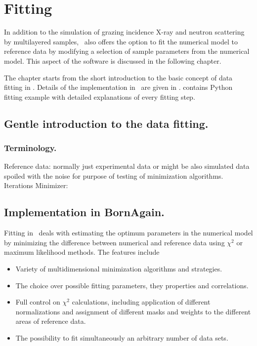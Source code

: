 \newpage
\chapter{Fitting} 

In addition to the simulation of grazing incidence
X-ray and neutron scattering by
multilayered samples, \BornAgain\ also offers the option to
fit the numerical model to reference data by modifying a selection of
sample parameters from the numerical model.  This aspect
of the software is discussed in the following chapter.

The chapter starts from the short introduction to the basic concept of data fitting
in . Details of the implementation in \BornAgain\ are given
in .
 contains Python fitting example with detailed explanations of every fitting step.


%
\section{Gentle introduction to the data fitting.} 

\subsection{Terminology.}
Reference data: normally just experimental data or might be also simulated data
spoiled with the noise for purpose of testing of minimization algorithms.
Iterations
Minimizer:


%
\section{Implementation in BornAgain.} 

Fitting in  \BornAgain\ deals with estimating the optimum parameters
in the numerical model by minimizing the difference between
numerical and reference data using $\chi^2$  or maximum likelihood methods. The features include 

\begin{itemize}
\item Variety of multidimensional minimization algorithms and strategies.
\item The choice over possible fitting parameters, they properties and correlations.
\item Full control on $\chi^2$ calculations, including application of different normalizations and assignment of different masks and weights to the different areas of reference data.
\item The possibility to fit simultaneously an arbitrary number of data sets.
\end{itemize}

